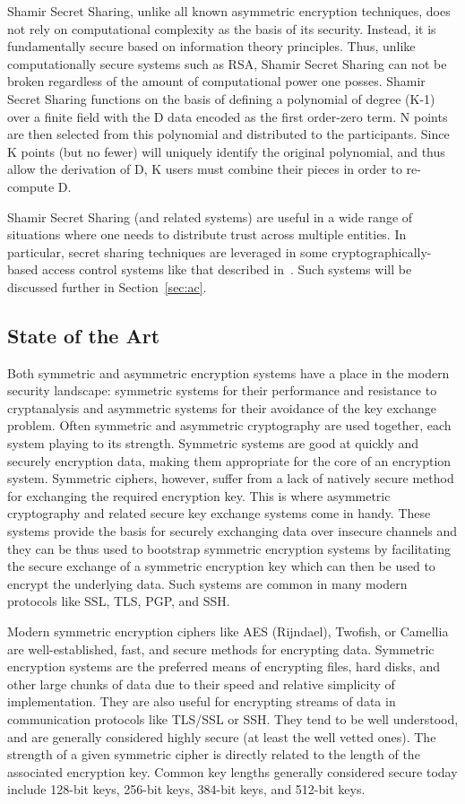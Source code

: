 \documentclass{sig-alternate}
\begin{document}
Shamir Secret Sharing, unlike all known asymmetric encryption
techniques, does not rely on computational complexity as the basis of
its security. Instead, it is fundamentally secure based on information
theory principles. Thus, unlike computationally secure systems such as
RSA, Shamir Secret Sharing can not be broken regardless of the amount
of computational power one posses. Shamir Secret Sharing functions on
the basis of defining a polynomial of degree (K-1) over a finite field
with the D data encoded as the first order-zero term. N points are
then selected from this polynomial and distributed to the
participants. Since K points (but no fewer) will uniquely identify the
original polynomial, and thus allow the derivation of D, K users must
combine their pieces in order to re-compute D.

Shamir Secret Sharing (and related systems) are useful in a wide range
of situations where one needs to distribute trust across multiple
entities. In particular, secret sharing techniques are leveraged in
some cryptographically-based access control systems like that
described in~\cite{Goyal2006}. Such systems will be discussed further
in Section~\ref{sec:ac}.

\subsection{State of the Art}

Both symmetric and asymmetric encryption systems have a place in the
modern security landscape: symmetric systems for their performance and
resistance to cryptanalysis and asymmetric systems for their
avoidance of the key exchange problem.  Often symmetric and asymmetric
cryptography are used together, each system playing to its
strength. Symmetric systems are good at quickly and securely
encryption data, making them appropriate for the core of an encryption
system. Symmetric ciphers, however, suffer from a lack of natively
secure method for exchanging the required encryption key. This is
where asymmetric cryptography and related secure key exchange systems
come in handy. These systems provide the basis for securely exchanging
data over insecure channels and they can be thus used to bootstrap
symmetric encryption systems by facilitating the secure exchange of a
symmetric encryption key which can then be used to encrypt the
underlying data. Such systems are common in many modern protocols like
SSL, TLS, PGP, and SSH.

Modern symmetric encryption ciphers like AES (Rijndael), Twofish, or
Camellia are well-established, fast, and secure methods for encrypting
data. Symmetric encryption systems are the preferred means of
encrypting files, hard disks, and other large chunks of data due to
their speed and relative simplicity of implementation. They are also
useful for encrypting streams of data in communication protocols like
TLS/SSL or SSH. They tend to be well understood, and are generally
considered highly secure (at least the well vetted ones). The strength
of a given symmetric cipher is directly related to the length of the
associated encryption key. Common key lengths generally considered
secure today include 128-bit keys, 256-bit keys, 384-bit keys, and
512-bit keys.
\end{document}
